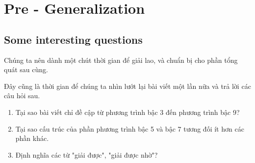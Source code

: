 \documentclass[a4paper,oneside]{book}
\numberwithin{equation}{chapter}
\begin{document}
\chapter{Pre - Generalization}
\section{Some interesting questions}
Chúng ta nên dành một chút thời gian để giải lao, và chuẩn bị cho phần tổng quát sau cùng.

Đây cũng là thời gian để chúng ta nhìn lướt lại bài viết một lần nữa và trả lời các câu hỏi sau.
\begin{enumerate}
\item Tại sao bài viết chỉ đề cập từ phương trình bậc 3 đến phương trình bậc 9?
\item Tại sao cấu trúc của phần phương trình bậc 5 và bậc 7 tương đối ít hơn các phần khác.
\item Định nghĩa các từ "giải được", "giải được nhờ"?
\end{enumerate}
\end{document}
